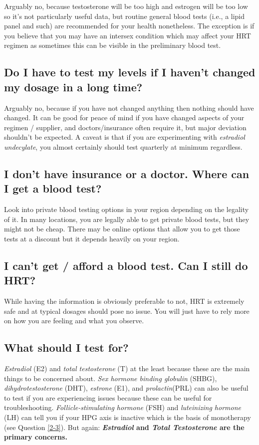 \documentclass{article}
\begin{document}
Arguably no, because testosterone will be too high and estrogen will be too low so it’s not particularly useful data, but routine general blood tests (i.e., a lipid panel and such) are recommended for your health nonetheless. The exception is if you believe that you may have an intersex condition which may affect your HRT regimen as sometimes this can be visible in the preliminary blood test.

\subsection{Do I have to test my levels if I haven’t changed my dosage in a long time?}

Arguably no, because if you have not changed anything then nothing should have changed. It can be good for peace of mind if you have changed aspects of your regimen / supplier, and doctors/insurance often require it, but major deviation shouldn’t be expected. A caveat is that if you are experimenting with \textit{estradiol undecylate}, you almost certainly should test quarterly at minimum regardless.

\subsection{I don’t have insurance or a doctor. Where can I get a blood test?}

Look into private blood testing options in your region depending on the legality of it. In many locations, you are legally able to get private blood tests, but they might not be cheap. There may be online options that allow you to get those tests at a discount but it depends heavily on your region.

\subsection{I can’t get / afford a blood test. Can I still do HRT?}

While having the information is obviously preferable to not, HRT is extremely safe and at typical dosages should pose no issue. You will just have to rely more on how you are feeling and what you observe.

\subsection{What should I test for?}

\textit{Estradiol} (E2) and \textit{total testosterone} (T) at the least because these are the main things to be concerned about. \textit{Sex hormone binding globulin} (SHBG), \textit{dihydrotestosterone} (DHT), \textit{estrone} (E1), and \textit{prolactin}(PRL) can also be useful to test if you are experiencing issues because these can be useful for troubleshooting. \textit{Follicle-stimulating hormone} (FSH) and \textit{luteinizing hormone} (LH) can tell you if your HPG axis is inactive which is the basis of monotherapy (see Question \ref{2-3}). But again: \textbf{\textit{Estradiol} and \textit{Total Testosterone} are the primary concerns.}
\end{document}
